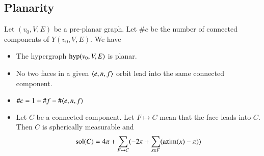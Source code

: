 \subsection{Planarity}



\begin{lemma}  Let $(v_0,V,E)$ be a pre-planar graph.  Let $\#c$ be the number
of connected components of $Y(v_0,V,E)$.  We have
    \begin{itemize}
    \item The hypergraph ${\operatorname{hyp}}(v_0,V,E)$ is planar.
    \item No two faces in a given $\langle e,n,f\rangle$ orbit lead
    into the same connected component.
    \item $\#c = 1 + \#f - \#\langle e,n,f\rangle$
    \item Let $C$ be a connected component. Let $F\mapsto C$ mean
    that the face leads into $C$.  Then $C$ is spherically measurable and
        $${\operatorname{sol}}(C) = 4\pi + \sum_{F\mapsto C}(-2\pi + \sum_{x\in F}
        ({\operatorname{azim}}(x)-\pi))$$
    \end{itemize}
\end{lemma}

